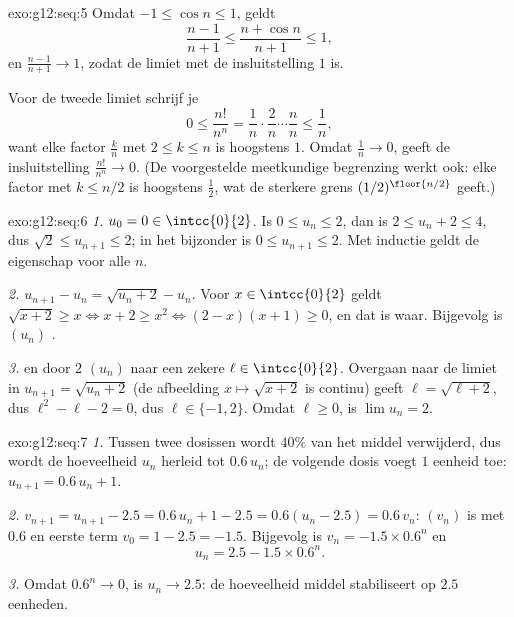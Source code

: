 \begin{solution}{exo:g12:seq:5}
Omdat $-1 \leq \cos n \leq 1$, geldt
\[
\frac{n-1}{n+1} \leq \frac{n + \cos n}{n+1} \leq 1,
\]
en $\frac{n-1}{n+1} \to 1$, zodat de limiet met de insluitstelling $1$ is.

Voor de tweede limiet schrijf je
\[
0 \leq \frac{n!}{n^n}
= \frac{1}{n}\cdot\frac{2}{n}\cdots\frac{n}{n}
\leq \frac{1}{n},
\]
want elke factor $\frac{k}{n}$ met $2 \leq k \leq n$ is hoogstens $1$. Omdat
$\frac1n \to 0$, geeft de insluitstelling $\frac{n!}{n^n} \to 0$. (De
voorgestelde meetkundige begrenzing werkt ook: elke factor met $k \leq n/2$
is hoogstens $\frac12$, wat de sterkere grens $(1/2)^{\floor{n/2}}$ geeft.)
\end{solution}

\begin{solution}{exo:g12:seq:6}
\emph{1.} $u_0 = 0 \in \intcc{0}{2}$. Is $0 \leq u_n \leq 2$, dan is
$2 \leq u_n + 2 \leq 4$, dus $\sqrt{2} \leq u_{n+1} \leq 2$; in het bijzonder
is $0 \leq u_{n+1} \leq 2$. Met inductie geldt de eigenschap voor alle $n$.

\emph{2.} $u_{n+1} - u_n = \sqrt{u_n + 2} - u_n$. Voor $x \in \intcc{0}{2}$
geldt $\sqrt{x+2} \geq x \iff x + 2 \geq x^2 \iff (2-x)(x+1) \geq 0$, en dat
is waar. Bijgevolg is $(u_n)$ .

\emph{3.}  en  door $2$  $(u_n)$ naar
een zekere $\ell \in \intcc{0}{2}$. Overgaan naar de limiet in
$u_{n+1} = \sqrt{u_n + 2}$ (de afbeelding $x \mapsto \sqrt{x+2}$ is continu)
geeft $\ell = \sqrt{\ell + 2}$, dus $\ell^2 - \ell - 2 = 0$, dus
$\ell \in \{-1, 2\}$. Omdat $\ell \geq 0$, is $\lim u_n = 2$.
\end{solution}

\begin{solution}{exo:g12:seq:7}
\emph{1.} Tussen twee dosissen wordt $40\%$ van het middel verwijderd, dus
wordt de hoeveelheid $u_n$ herleid tot $0.6\,u_n$; de volgende dosis voegt
$1$ eenheid toe: $u_{n+1} = 0.6\,u_n + 1$.

\emph{2.} $v_{n+1} = u_{n+1} - 2.5 = 0.6\,u_n + 1 - 2.5 = 0.6(u_n - 2.5)
= 0.6\,v_n$: $(v_n)$ is  met  $0.6$ en eerste term
$v_0 = 1 - 2.5 = -1.5$. Bijgevolg is $v_n = -1.5 \times 0.6^n$ en
\[
u_n = 2.5 - 1.5 \times 0.6^n .
\]

\emph{3.} Omdat $0.6^n \to 0$, is $u_n \to 2.5$: de hoeveelheid middel
stabiliseert op $2.5$ eenheden.
\end{solution}

